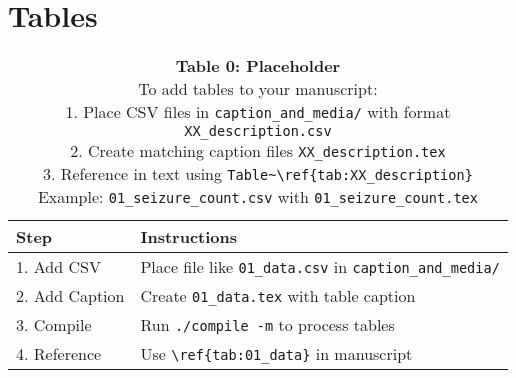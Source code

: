 \section*{Tables}
\label{tables}

\begin{table}[htbp]
    \centering
    \caption{\textbf{Table 0: Placeholder}\\
    \smallskip
    To add tables to your manuscript:\\
    1. Place CSV files in \texttt{caption\_and\_media/} with format \texttt{XX\_description.csv}\\
    2. Create matching caption files \texttt{XX\_description.tex}\\
    3. Reference in text using \texttt{Table\textasciitilde\textbackslash ref\{tab:XX\_description\}}\\
    \smallskip
    Example: \texttt{01\_seizure\_count.csv} with \texttt{01\_seizure\_count.tex}
    }
    \label{tab:0_Tables_Header}
    \begin{tabular}{p{}p{}}
        \toprule
        \textbf{Step} & \textbf{Instructions} \\
        \midrule
        1. Add CSV & Place file like \texttt{01\_data.csv} in \texttt{caption\_and\_media/} \\
        2. Add Caption & Create \texttt{01\_data.tex} with table caption \\
        3. Compile & Run \texttt{./compile -m} to process tables \\
        4. Reference & Use \texttt{\textbackslash ref\{tab:01\_data\}} in manuscript \\
        \bottomrule
    \end{tabular}
\end{table}
